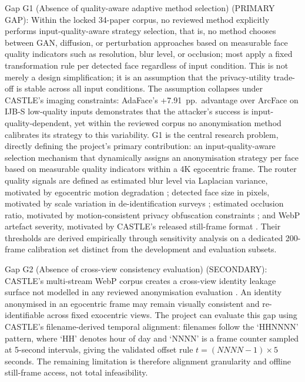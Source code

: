 \documentclass[12pt, onecolumn]{IEEEtran}
\begin{document}
Gap G1 (Absence of quality-aware adaptive method selection) (PRIMARY
GAP): Within the locked 34-paper corpus, no reviewed method explicitly
performs input-quality-aware strategy selection, that is, no method
chooses between GAN, diffusion, or perturbation approaches based on
measurable face quality indicators such as resolution, blur level, or
occlusion; most apply a fixed transformation rule per detected face
regardless of input condition. This is not merely a design
simplification; it is an assumption that the privacy-utility trade-off
is stable across all input conditions. The assumption collapses under
CASTLE's imaging constraints: AdaFace's +7.91~pp.\  advantage over
ArcFace on IJB-S low-quality inputs \cite{kim2022adaface} demonstrates
that the attacker's success is input-quality-dependent, yet within the
reviewed corpus no anonymisation method calibrates its strategy to this
variability. G1 is the central research problem, directly defining the
project's primary contribution: an input-quality-aware selection
mechanism that dynamically assigns an anonymisation strategy per face
based on measurable quality indicators within a 4K egocentric frame.
The router quality signals are defined as estimated blur level via
Laplacian variance, motivated by egocentric motion degradation
\cite{thapar2021anonymizing}; detected face size in pixels, motivated by
scale variation in de-identification surveys \cite{khan2024survey};
estimated occlusion ratio, motivated by motion-consistent privacy
obfuscation constraints \cite{ilic2024selective}; and WebP artefact
severity, motivated by CASTLE's released still-frame format
\cite{rossetto2025castle}. Their thresholds are derived empirically
through sensitivity analysis on a dedicated 200-frame calibration set
distinct from the development and evaluation subsets.

Gap G2 (Absence of cross-view consistency evaluation) (SECONDARY):
CASTLE's multi-stream WebP corpus creates a cross-view identity leakage
surface not modelled in any reviewed anonymisation evaluation
\cite{rossetto2025castle}. An identity anonymised in an egocentric frame
may remain visually consistent and re-identifiable across fixed
exocentric views. The project can evaluate this gap using CASTLE's
filename-derived temporal alignment: filenames follow the `HHNNNN'
pattern, where `HH' denotes hour of day and `NNNN' is a frame counter
sampled at 5-second intervals, giving the validated offset rule
$t=(NNNN-1)\times5$ seconds. The remaining limitation is therefore
alignment granularity and offline still-frame access, not total
infeasibility.
\end{document}

